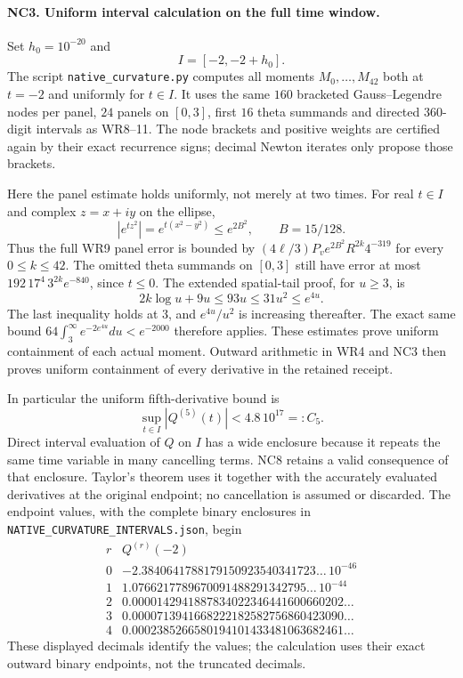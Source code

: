\documentclass[11pt,a4paper]{article}
\theoremstyle{definition}\newtheorem{definition}[theorem]{Definition}
\begin{document}
\paragraph{NC3. Uniform interval calculation on the full time window.}
Set $h_0=10^{-20}$ and
\[
 I=[-2,-2+h_0].\tag{NC5}
\]
The script \texttt{native\_curvature.py} computes all moments
$M_0,\ldots,M_{42}$ both at $t=-2$ and uniformly for $t\in I$.
It uses the same $160$ bracketed Gauss--Legendre nodes per panel,
$24$ panels on $[0,3]$, first $16$ theta summands and directed
$360$-digit intervals as WR8--11. The node brackets and positive
weights are certified again by their exact recurrence signs;
decimal Newton iterates only propose those brackets.

Here the panel estimate holds uniformly, not merely at two times.
For real $t\in I$ and complex $z=x+iy$ on the ellipse,
\[
 |e^{tz^2}|=e^{t(x^2-y^2)}\le e^{2B^2},\qquad B=15/128.
 \tag{NC6}
\]
Thus the full WR9 panel error is bounded by
$(4\ell/3)P_v e^{2B^2}R^{2k}4^{-319}$ for every $0\le k\le42$.
The omitted theta summands on $[0,3]$ still have error at most
$192\,17^4\,3^{2k}e^{-840}$, since $t\le0$.
The extended spatial-tail proof, for $u\ge3$, is
\[
 2k\log u+9u\le93u\le31u^2\le e^{4u}.
 \tag{NC7}
\]
The last inequality holds at $3$, and $e^{4u}/u^2$ is increasing
thereafter. The exact same bound
$64\int_3^\infty e^{-2e^{4u}}du<e^{-2000}$ therefore applies.
These estimates prove uniform containment of each actual moment.
Outward arithmetic in WR4 and NC3 then proves uniform containment
of every derivative in the retained receipt.

In particular the uniform fifth-derivative bound is
\[
 \sup_{t\in I}|Q^{(5)}(t)|<4.8\,10^{17}=:C_5.
 \tag{NC8}
\]
Direct interval evaluation of $Q$ on $I$ has a wide enclosure
because it repeats the same time variable in many cancelling terms.
NC8 retains a valid consequence of that enclosure. Taylor's theorem
uses it together with the accurately evaluated derivatives at the
original endpoint; no cancellation is assumed or discarded.
The endpoint values, with the complete binary enclosures in
\texttt{NATIVE\_CURVATURE\_INTERVALS.json}, begin
\[
\begin{array}{c|r}
r&Q^{(r)}(-2)\\\hline
0&-2.3840641788179150923540341723\ldots\,10^{-46}\\
1& 1.0766217789670091488291342795\ldots\,10^{-44}\\
2& 0.0000142941887834022346441600660202\ldots\\
3& 0.0000713941668222182582756860423090\ldots\\
4& 0.0002385266580194101433481063682461\ldots
\end{array}\tag{NC9}
\]
These displayed decimals identify the values; the calculation uses
their exact outward binary endpoints, not the truncated decimals.
\end{document}
